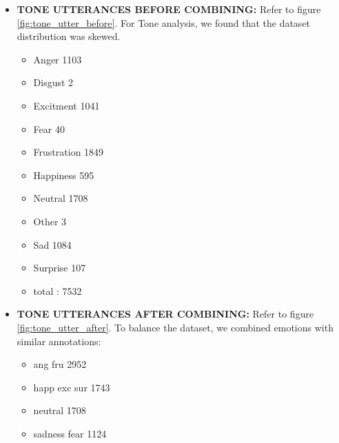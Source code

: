 \documentclass[oneside,a4paper,12pt]{report}
\begin{document}
\begin{normalsize}
\begin{itemize}
\begin{itemize}
				
				\vspace{10mm}
				\item \textbf{TONE UTTERANCES BEFORE COMBINING:}
				Refer to figure \ref{fig:tone_utter_before}. For Tone analysis, we found that the dataset distribution was skewed.
				\begin{itemize}
				\item Anger 1103
				\item Disgust 2
				\item Excitment 1041
				\item Fear 40
				\item Frustration 1849
				\item Happiness 595
				\item Neutral 1708	
				\item Other 3
				\item Sad 1084
				\item Surprise 107
				
				\item total : 7532
			\end{itemize}	
				\vspace{10mm}
				\item \textbf{TONE UTTERANCES AFTER COMBINING:}
				Refer to figure \ref{fig:tone_utter_after}. To balance the dataset, we combined emotions with similar annotations:
				\begin{itemize}
					\item 	ang fru 2952
					\item happ exc sur 1743
					\item neutral 1708
					\item sadness fear 1124
				\end{itemize}
		
			\end{itemize}
		

\end{itemize}
\end{normalsize}
\end{document}
